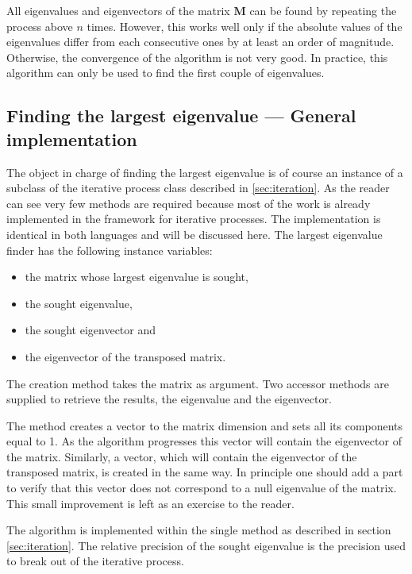 All eigenvalues and eigenvectors of the matrix $\textbf{M}$ can be
found by repeating the process above $n$ times. However, this
works well only if the absolute values of the eigenvalues differ
from each consecutive ones by at least an order of magnitude.
Otherwise, the convergence of the algorithm is not very good. In
practice, this algorithm can only be used to find the first couple
of eigenvalues.

\subsection{Finding the largest eigenvalue --- General implementation}
The object in charge of finding the largest eigenvalue is of course an instance
of a subclass of the iterative process class described in
\ref{sec:iteration}. As the reader can see very few methods are
required because most of the work is already implemented in the
framework for iterative processes. The implementation is identical
in both languages and will be discussed here. The largest
eigenvalue finder has the following instance variables:
\begin{itemize}
  \item {} the matrix whose largest eigenvalue is sought,
  \item {} the sought eigenvalue,
  \item {} the sought eigenvector and
  \item {} the eigenvector of the
  transposed matrix.
\end{itemize}
The creation method takes the matrix as argument. Two accessor
methods are supplied to retrieve the results, the eigenvalue and
the eigenvector.

The method  creates a vector to the
matrix dimension and sets all its components equal to 1. As the
algorithm progresses this vector will contain the eigenvector of
the matrix. Similarly, a vector, which will contain the
eigenvector of the transposed matrix, is created in the same way.
In principle one should add a part to verify that this vector does
not correspond to a null eigenvalue of the matrix. This small
improvement is left as an exercise to the reader.

The algorithm is implemented within the single method  as described in section \ref{sec:iteration}.
The relative precision of the sought eigenvalue is the precision
used to break out of the iterative process.

